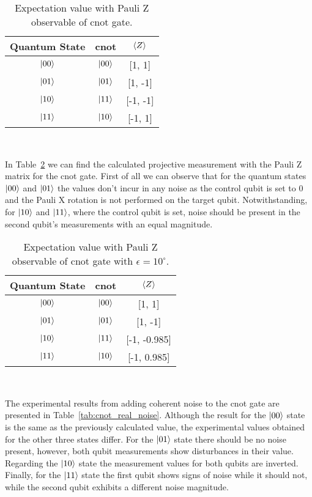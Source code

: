 \begin{table}[h]
  \centering
  \begin{tabular}{|c|c|c|}
    \hline
    Quantum State & \ac{cnot} & \(\expval{Z}\) \\
    \hline
    \(\ket{00}\) & \(\ket{00}\) & [1, 1] \\
    \hline
    \(\ket{01}\) & \(\ket{01}\) & [1, -1] \\
    \hline
    \(\ket{10}\) & \(\ket{11}\) & [-1, -1] \\
    \hline
    \(\ket{11}\) & \(\ket{10}\) & [-1, 1] \\
    \hline
  \end{tabular}
  \caption{Expectation value with Pauli Z observable of \ac{cnot} gate.}\label{tab:cnot_ideal}
\end{table} \

In Table~\ref{tab:cnot_iso_noise} we can find the calculated
projective measurement with the Pauli Z matrix for the \ac{cnot} gate.
First of all we can observe that for the quantum states \(\ket{00}\)
and \(\ket{01}\) the values don't incur in any noise as the control
qubit is set to 0 and the Pauli X rotation is not performed on the target
qubit. Notwithstanding, for \(\ket{10}\) and \(\ket{11}\), where the
control qubit is set, noise should be present in the second qubit's
measurements with an equal magnitude. \

\begin{table}[h]
  \centering
  \begin{tabular}{|c|c|c|}
    \hline
    Quantum State & \ac{cnot} & \(\expval{Z}\) \\
    \hline
    \(\ket{00}\) & \(\ket{00}\) & [1, 1] \\
    \hline
    \(\ket{01}\) & \(\ket{01}\) & [1, -1] \\
    \hline
    \(\ket{10}\) & \(\ket{11}\) & [-1, -0.985] \\
    \hline
    \(\ket{11}\) & \(\ket{10}\) & [-1, 0.985] \\
    \hline
  \end{tabular}
  \caption{Expectation value with Pauli Z observable of \ac{cnot} gate with \(\epsilon = 10^{\circ}\).}\label{tab:cnot_iso_noise}
\end{table} \

The experimental results from adding coherent noise to the
\ac{cnot} gate are presented in Table~\ref{tab:cnot_real_noise}.
Although the result for the \(\ket{00}\) state is the same as the
previously calculated value, the experimental values obtained for
the other three states differ. For the \(\ket{01}\) state there
should be no noise present, however, both qubit measurements
show disturbances in their value. Regarding the \(\ket{10}\) state
the measurement values for both qubits are inverted. Finally,
for the \(\ket{11}\) state the first qubit shows signs of noise
while it should not, while the second qubit exhibits a different noise
magnitude. \

